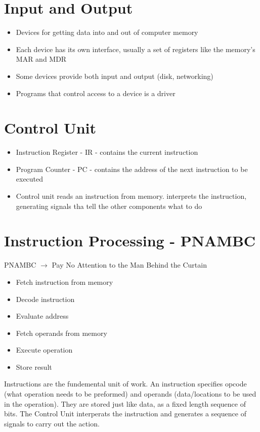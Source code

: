 \documentclass{article}
\begin{document}
\section{Input and Output}
\begin{itemize}
  \item Devices for getting data into and out of computer memory
  \item Each device has its own interface, usually a set of registers like the memory's MAR and MDR
  \item Some devices provide both input and output (disk, networking)
  \item Programs that control access to a device is a driver
\end{itemize}

\section{Control Unit}
\begin{itemize}
  \item Instruction Register - IR - contains the current instruction
  \item Program Counter - PC - contains the address of the next instruction to be executed
  \item Control unit reads an instruction from memory. interprets the instruction, generating signals tha tell the other components what to do
\end{itemize}

\section{Instruction Processing - PNAMBC}
PNAMBC $\to$ Pay No Attention to the Man Behind the Curtain
\begin{itemize}
  \item Fetch instruction from memory
  \item Decode instruction
  \item Evaluate address
  \item Fetch operands from memory
  \item Execute operation
  \item Store result
\end{itemize}
Instructions are the fundemental unit of work. An instruction specifies opcode (what operation needs to be preformed) and operands (data/locations to be used in the operation). They are stored just like data, as a fixed length sequence of bits. The Control Unit interperats the instruction and generates a sequence of signals to carry out the action.
\end{document}
